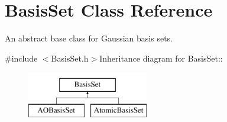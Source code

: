 \hypertarget{classJKBuilder_1_1BasisSet}{
\section{BasisSet Class Reference}
\label{classJKBuilder_1_1BasisSet}
}


An abstract base class for Gaussian basis sets.  


{\ttfamily \#include $<$BasisSet.h$>$}Inheritance diagram for BasisSet::\begin{figure}[H]
\begin{center}
\leavevmode
\includegraphics[height=2cm]{classJKBuilder_1_1BasisSet}
\end{center}
\end{figure}
